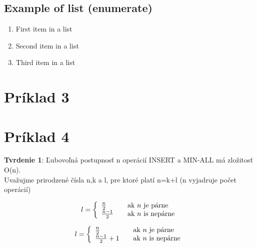 \documentclass[paper=a4, fontsize=11pt]{scrartcl} %
\numberwithin{equation}{section} %
\numberwithin{figure}{section} %
\numberwithin{table}{section} %
\begin{document}

\subsection{Example of list (enumerate)}
\begin{enumerate}
\item First item in a list 
\item Second item in a list 
\item Third item in a list
\end{enumerate}


\pagebreak

\section*{Príklad 3}

\pagebreak

\section*{Príklad 4}

\textbf{Tvrdenie 1}: Ľubovoľná postupnosť n operácií INSERT  a MIN-ALL má zložitosť O(n). \\

Uvažujme prirodzené čísla n,k a l, pre ktoré platí n=k+l (n vyjadruje počet operácií)

\[ l = \left\{ 
  \begin{array}{l l}
    \frac{n}{2} & \quad \text{ak $n$ je párne}\\
    \frac{n-1}{2} & \quad \text{ak $n$ is nepárne}
  \end{array} \right.\]

\[ l = \left\{ 
  \begin{array}{l l}
    \frac{n}{2} & \quad \text{ak $n$ je párne}\\
    \frac{n-1}{2} + 1 & \quad \text{ak $n$ is nepárne}
  \end{array} \right.\]
\end{document}
